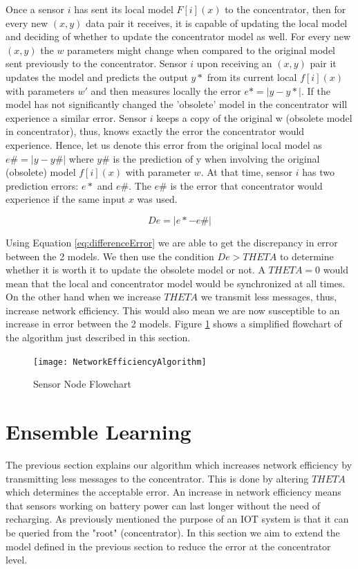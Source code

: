 \documentclass{mproj}
\begin{document}
Once a sensor $i$ has sent its local model $F[i](x)$ to the concentrator, then for every new $(x,y)$ data pair it receives, it is capable of updating the local model and deciding of whether to update the concentrator model as well. For every new $(x,y)$ the $w$ parameters might change when compared to the original model sent previously to the concentrator. Sensor $i$ upon receiving an $(x,y)$ pair it updates the model and predicts the output $y*$ from its current local $f[i](x)$ with parameters $w'$ and then measures locally the error $e* = |y-y*|$. If the model has not significantly changed the 'obsolete' model in the concentrator will experience a similar error. Sensor $i$ keeps a copy of the original w (obsolete model in concentrator), thus, knows exactly the error the concentrator would experience. Hence, let us denote this error from the original local model as $e\# = |y - y\#|$ where $y\#$ is the prediction of y when involving the original (obsolete) model $f[i](x)$ with parameter $w$. At that time, sensor $i$ has two prediction errors: $e*$ and $e\#$. The $e\#$ is the error that concentrator would experience if the same input $x$ was used.

\begin{equation}
\label{eq:differenceError}
De = |e* - e\#|
\end{equation}

Using Equation \ref{eq:differenceError} we are able to get the discrepancy in error between the 2 models. We then use the condition $De > THETA$ to determine whether it is worth it to update the obsolete model or not. A $THETA=0$ would mean that the local and concentrator model would be synchronized at all times. On the other hand when we increase $THETA$ we transmit less messages, thus, increase network efficiency. This would also mean we are now susceptible to an increase in error between the 2 models. Figure \ref{fig:nea} shows a simplified flowchart of the algorithm just described in this section.


\begin{figure}[H]
\caption{Sensor Node Flowchart}
\label{fig:nea}
\centerline{\texttt{[image: NetworkEfficiencyAlgorithm]}}
\end{figure}

\section{Ensemble Learning}
\label{sec:ensembleLearning}
The previous section explains our algorithm which increases network efficiency by transmitting less messages to the concentrator. This is done by altering $THETA$ which determines the acceptable error. An increase in network efficiency means that sensors working on battery power can last longer without the need of recharging. As previously mentioned the purpose of an IOT system is that it can be queried from the "root" (concentrator). In this section we aim to extend the model defined in the previous section to reduce the error at the concentrator level.
\end{document}
